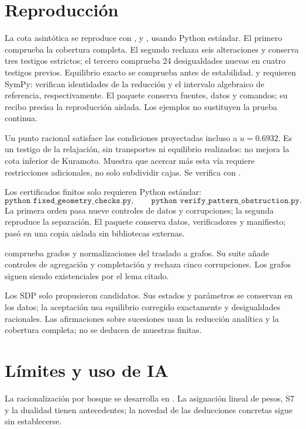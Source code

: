 \documentclass[10pt,a4paper]{article}
\begin{document}
\section{Reproducción}
La cota asintótica se reproduce con ,  y , usando Python estándar. El primero comprueba la cobertura completa. El segundo rechaza seis alteraciones y conserva tres testigos estrictos; el tercero comprueba 24 desigualdades nuevas en cuatro testigos previos. Equilibrio exacto se comprueba antes de estabilidad.  y  requieren SymPy: verifican identidades de la reducción y el intervalo algebraico de referencia, respectivamente. El paquete  conserva fuentes, datos y comandos; su recibo precisa la reproducción aislada. Los ejemplos no sustituyen la prueba continua.

Un punto racional satisface las condiciones proyectadas incluso a $u=0.6932$. Es un testigo de la relajación, sin transportes ni equilibrio realizados: no mejora la cota inferior de Kuramoto. Muestra que acercar más esta vía requiere restricciones adicionales, no solo subdividir cajas. Se verifica con .

Los certificados finitos solo requieren Python estándar:
\[
 \texttt{python fixed\_geometry\_checks.py},\qquad
 \texttt{python verify\_pattern\_obstruction.py}.
\]
La primera orden pasa nueve controles de datos y corrupciones; la segunda reproduce la separación. El paquete  conserva datos, verificadores y manifiesto; pasó en una copia aislada sin bibliotecas externas.

 comprueba grados y normalizaciones del traslado a grafos. Su suite añade controles de agregación y completación y rechaza cinco corrupciones. Los grafos siguen siendo existenciales por el lema citado.

Los SDP solo propusieron candidatos. Sus estados y parámetros se conservan en los datos; la aceptación usa equilibrio corregido exactamente y desigualdades racionales. Las afirmaciones sobre sucesiones usan la reducción analítica y la cobertura completa; no se deducen de muestras finitas.

\section{Límites y uso de IA}
La racionalización por bosque se desarrolla en . La asignación lineal de pesos, S7 y la dualidad tienen antecedentes; la novedad de las deducciones concretas sigue sin establecerse.
\end{document}
